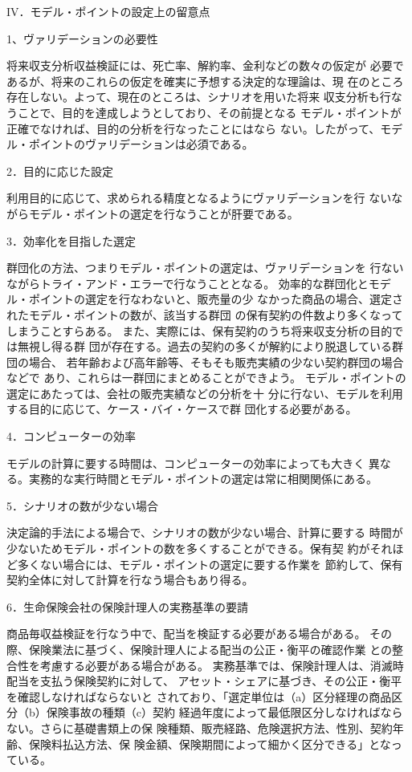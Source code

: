 \documentclass[report,gutter=10mm,fore-edge=10mm,uplatex,dvipdfmx]{jlreq}
\begin{document}
IV．モデル・ポイントの設定上の留意点

1、ヴァリデーションの必要性

将来収支分析収益検証には、死亡率、解約率、金利などの数々の仮定が
必要であるが、将来のこれらの仮定を確実に予想する決定的な理論は、現
在のところ存在しない。よって、現在のところは、シナリオを用いた将来
収支分析も行なうことで、目的を達成しようとしており、その前提となる
モデル・ポイントが正確でなければ、目的の分析を行なったことにはなら
ない。したがって、モデル・ポイントのヴァリデーションは必須である。

2．目的に応じた設定

利用目的に応じて、求められる精度となるようにヴァリデーションを行
ないながらモデル・ポイントの選定を行なうことが肝要である。

3．効率化を目指した選定

群団化の方法、つまりモデル・ポイントの選定は、ヴァリデーションを
行ないながらトライ・アンド・エラーで行なうこととなる。
効率的な群団化とモデル・ポイントの選定を行なわないと、販売量の少
なかった商品の場合、選定されたモデル・ポイントの数が、該当する群団
の保有契約の件数より多くなってしまうことすらある。
また、実際には、保有契約のうち将来収支分析の目的では無視し得る群
団が存在する。過去の契約の多くが解約により脱退している群団の場合、
若年齢および高年齢等、そもそも販売実績の少ない契約群団の場合などで
あり、これらは一群団にまとめることができよう。
モデル・ポイントの選定にあたっては、会社の販売実績などの分析を十
分に行ない、モデルを利用する目的に応じて、ケース・バイ・ケースで群
団化する必要がある。

4．コンピューターの効率

モデルの計算に要する時間は、コンピューターの効率によっても大きく
異なる。実務的な実行時間とモデル・ポイントの選定は常に相関関係にある。

5．シナリオの数が少ない場合

決定論的手法による場合で、シナリオの数が少ない場合、計算に要する
時間が少ないためモデル・ポイントの数を多くすることができる。保有契
約がそれほど多くない場合には、モデル・ポイントの選定に要する作業を
節約して、保有契約全体に対して計算を行なう場合もあり得る。

6．生命保険会社の保険計理人の実務基準の要請

商品毎収益検証を行なう中で、配当を検証する必要がある場合がある。
その際、保険業法に基づく、保険計理人による配当の公正・衡平の確認作業
との整合性を考慮する必要がある場合がある。
実務基準では、保険計理人は、消滅時配当を支払う保険契約に対して、
アセット・シェアに基づき、その公正・衡平を確認しなければならないと
されており、「選定単位は（a）区分経理の商品区分（b）保険事故の種類（c）契約
経過年度によって最低限区分しなければならない。さらに基礎書類上の保
険種類、販売経路、危険選択方法、性別、契約年齢、保険料払込方法、保
険金額、保険期間によって細かく区分できる」となっている。
\end{document}

